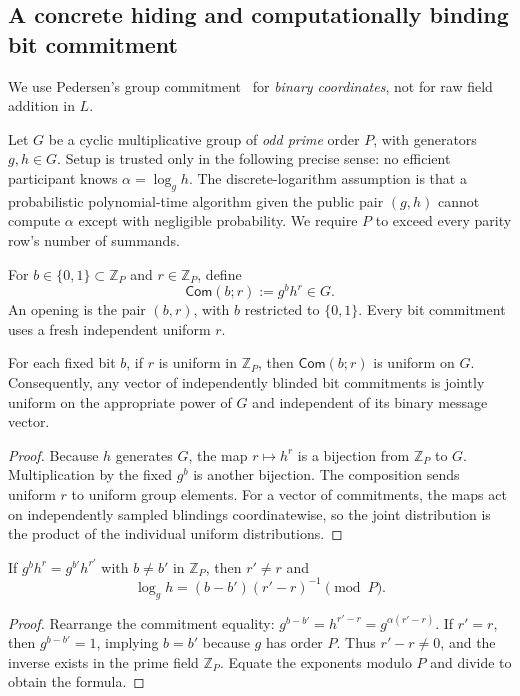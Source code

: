 \subsection{A concrete hiding and computationally binding bit commitment}\label{sec:realize:pedersen}
We use Pedersen's group commitment~\cite{Pedersen1991}
for \emph{binary coordinates}, not for raw field addition in $L$.

\begin{definition}\label{def:realize:group}
Let $G$ be a cyclic multiplicative group of \emph{odd prime}
order $P$, with generators $g,h\in G$. Setup is trusted only
in the following precise sense: no efficient participant
knows $\alpha=\log_g h$.
The discrete-logarithm assumption is that a probabilistic
polynomial-time algorithm given the public pair $(g,h)$
cannot compute $\alpha$ except with negligible probability.
We require $P$ to exceed every parity row's number of summands.
\end{definition}

\begin{definition}\label{def:realize:commit}
For $b\in\{0,1\}\subset\mathbb Z_P$ and
$r\in\mathbb Z_P$, define
\[
 \mathsf{Com}(b;r):=g^b h^r\in G.
\]
An opening is the pair $(b,r)$, with $b$ restricted to
$\{0,1\}$. Every bit commitment uses a fresh independent
uniform $r$.
\end{definition}

\begin{lemma}\label{lem:realize:hiding}
For each fixed bit $b$, if $r$ is uniform in $\mathbb Z_P$,
then $\mathsf{Com}(b;r)$ is uniform on $G$.
Consequently, any vector of independently blinded bit
commitments is jointly uniform on the appropriate power of $G$
and independent of its binary message vector.
\end{lemma}
\begin{proof}
Because $h$ generates $G$, the map $r\mapsto h^r$
is a bijection from $\mathbb Z_P$ to $G$.
Multiplication by the fixed $g^b$ is another bijection.
The composition sends uniform $r$ to uniform group elements.
For a vector of commitments, the maps act on independently
sampled blindings coordinatewise, so the joint distribution
is the product of the individual uniform distributions.
\end{proof}

\begin{lemma}\label{lem:realize:binding-reduction}
If
$g^b h^r=g^{b'}h^{r'}$ with
$b\ne b'$ in $\mathbb Z_P$, then
$r'\ne r$ and
\[
 \boxed{\log_g h=(b-b')(r'-r)^{-1}\pmod P.}
\]
\end{lemma}
\begin{proof}
Rearrange the commitment equality:
$g^{b-b'}=h^{r'-r}=g^{\alpha(r'-r)}$.
If $r'=r$, then $g^{b-b'}=1$, implying
$b=b'$ because $g$ has order $P$.
Thus $r'-r\ne0$, and the inverse exists in
the prime field $\mathbb Z_P$. Equate the exponents modulo $P$
and divide to obtain the formula.
\end{proof}

